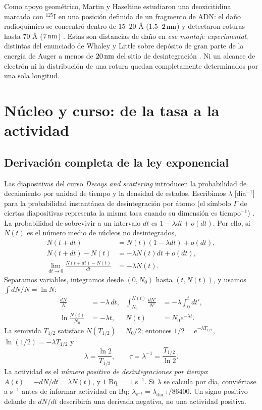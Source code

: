 \documentclass[11pt,a4paper]{article}
\begin{document}
Como apoyo geométrico, Martin y Haseltine estudiaron una deoxicitidina marcada con $^{125}$I en una posición definida de un fragmento de ADN: el daño radioquímico se concentró dentro de $15$--$20$ \AA{} ($1.5$--$2\,\mathrm{nm}$) y detectaron roturas hasta $70$ \AA{} ($7\,\mathrm{nm}$) \cite{martin}. Estas son distancias de daño en \emph{ese montaje experimental}, distintas del enunciado de Whaley y Little sobre depósito de gran parte de la energía de Auger a menos de $20\,\mathrm{nm}$ del sitio de desintegración \cite{whaley}. Ni un alcance de electrón ni la distribución de una rotura quedan completamente determinados por una sola longitud.

\section{Núcleo y curso: de la tasa a la actividad}
\subsection{Derivación completa de la ley exponencial}
Las diapositivas del curso \emph{Decays and scattering} introducen la probabilidad de decaimiento por unidad de tiempo y la densidad de estados. Escribimos $\lambda$ [día$^{-1}$] para la probabilidad instantánea de desintegración por átomo (el símbolo $\Gamma$ de ciertas diapositivas representa la misma tasa cuando su dimensión es tiempo$^{-1}$) \cite{curso}. La probabilidad de sobrevivir a un intervalo $dt$ es $1-\lambda dt+o(dt)$. Por ello, si $N(t)$ es el número medio de núcleos no desintegrados,
\begin{align}
N(t+dt)&=N(t)(1-\lambda dt)+o(dt),\\
N(t+dt)-N(t)&=-\lambda N(t)dt+o(dt),\\
\lim_{dt\to0}\frac{N(t+dt)-N(t)}{dt}&=-\lambda N(t).
\end{align}
Separamos variables, integramos desde $(0,N_0)$ hasta $(t,N(t))$, y usamos $\int dN/N=\ln N$:
\begin{align}
\frac{dN}{N}&=-\lambda\,dt, &
\int_{N_0}^{N(t)}\frac{dN'}{N'}&=-\lambda\int_0^t dt',\\
\ln\!\frac{N(t)}{N_0}&=-\lambda t, &N(t)&=N_0e^{-\lambda t}.
\end{align}
La semivida $T_{1/2}$ satisface $N(T_{1/2})=N_0/2$; entonces $1/2=e^{-\lambda T_{1/2}}$, $\ln(1/2)=-\lambda T_{1/2}$ y
\begin{equation}\boxed{\lambda=\frac{\ln2}{T_{1/2}},\qquad \tau=\lambda^{-1}=\frac{T_{1/2}}{\ln2}.}\end{equation}
La actividad es el \emph{número positivo de desintegraciones por tiempo}: $A(t)=-dN/dt=\lambda N(t)$, y $1$ Bq $=1$ s$^{-1}$. Si $\lambda$ se calcula por día, conviértase a s$^{-1}$ antes de informar actividad en Bq: $\lambda_{\mathrm{s}^{-1}}=\lambda_{\mathrm{día}^{-1}}/86400$. Un signo positivo delante de $dN/dt$ describiría una derivada negativa, no una actividad positiva.
\end{document}
